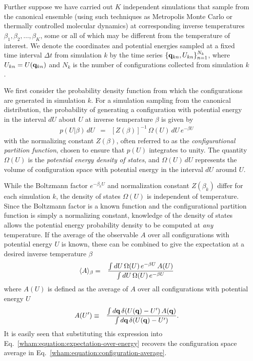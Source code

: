 Further suppose we have carried out $K$ independent simulations that sample from the canonical ensemble (using such techniques as Metropolis Monte Carlo or thermally controlled molecular dynamics) at corresponding inverse temperatures $\beta_1, \beta_2, \ldots, \beta_K$, some or all of which may be different from the temperature of interest.  We denote the coordinates and potential energies sampled at a fixed time interval $\Delta t$ from simulation $k$ by the time series $\{ {\bf q}_{kn}, U_{kn} \}_{n=1}^{N_k}$, where $U_{kn} = U({\bf q}_{kn})$ and $N_k$ is the number of configurations collected from simulation $k$.

We first consider the probability density function from which the configurations are generated in simulation $k$.  For a simulation sampling from the canonical distribution, the probability of generating a configuration with potential energy in the interval $dU$ about $U$ at inverse temperature $\beta$ is given by
\begin{eqnarray}   
p(U | \beta) \, dU &=& [Z(\beta)]^{-1} \, \Omega(U) \, dU \, e^{-\beta U}
\end{eqnarray}
with the normalizing constant $Z(\beta)$, often referred to as the \emph{configurational partition function}, chosen to ensure that $p(U)$ integrates to unity. The quantity $\Omega(U)$ is the \emph{potential energy density of states}, and $\Omega(U) \, dU$ represents the volume of configuration space with potential energy in the interval $dU$ around $U$.

While the Boltzmann factor $e^{-\beta_k U}$ and normalization constant $Z(\beta_k)$ differ for each simulation $k$, the density of states $\Omega(U)$ is independent of temperature. Since the Boltzmann factor is a known function and the configurational partition function is simply a normalizing constant, knowledge of the density of states allows the potential energy probability density to be computed at \emph{any} temperature.  If the average of the observable $A$ over all configurations with potential energy $U$ is known, these can be combined to give the expectation at a desired inverse temperature $\beta$
\begin{eqnarray}
\langle A \rangle_\beta &=& \frac{\int dU \, \Omega(U) \, e^{-\beta U} \, A(U)}{\int dU \, \Omega(U) \, e^{-\beta U}} \label{wham:equation:expectation-over-energy}
\end{eqnarray}
where $A(U)$ is defined as the average of $A$ over all configurations with potential energy $U$
\begin{eqnarray}
A(U') &\equiv& \frac{\int d{\bf q} \, \delta(U({\bf q}) - U') \, A({\bf q})}{\int d{\bf q} \, \delta(U({\bf q}) - U')}. \label{wham:equation:a-of-u}
\end{eqnarray}
It is easily seen that substituting this expression into Eq.\ \ref{wham:equation:expectation-over-energy} recovers the configuration space average in Eq.\ \ref{wham:equation:configuration-average}.

